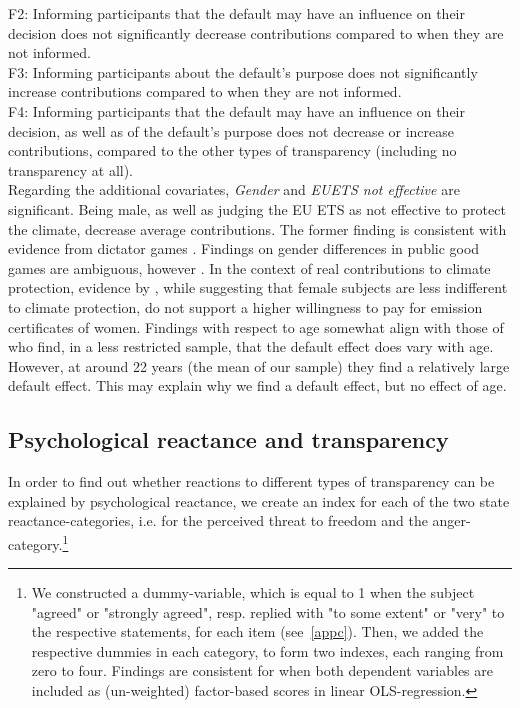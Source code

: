 \documentclass[review, authoryear,12pt]{elsarticle}
\begin{document}
F2: Informing participants that the default may have an influence on their decision does not significantly decrease contributions compared to when they are not informed.\\

F3: Informing participants about the default's purpose does not significantly increase contributions compared to when they are not informed.\\

F4: Informing participants that the default may have an influence on their decision, as well as of the default's purpose does not decrease or increase contributions, compared to the other types of transparency (including no transparency at all).\\

Regarding the additional covariates, \textit{Gender} and \textit{EUETS not effective} are significant. Being male, as well as judging the EU ETS as not effective to protect the climate, decrease average contributions. The former finding is consistent with evidence from dictator games \citep{Engel.2011}. Findings on gender differences in public good games are ambiguous, however \citep{Croson.2009}. In the context of real contributions to climate protection, evidence by \cite{Diederich.2014}, while suggesting that female subjects are less indifferent to climate protection, do not support a higher willingness to pay for emission certificates of women. Findings with respect to age somewhat align with those of \cite{Borghans.2015} who find, in a less restricted sample, that the default effect does vary with age. However, at around 22 years (the mean of our sample) they find a relatively large default effect. This may explain why we find a default effect, but no effect of age.

\subsection{Psychological reactance and transparency}
In order to find out whether reactions to different types of transparency can be explained by psychological reactance, we create an index for each of the two state reactance-categories, i.e. for the perceived threat to freedom and the anger-category.\footnote{We constructed a dummy-variable, which is equal to 1 when the subject "agreed" or "strongly agreed", resp. replied with "to some extent" or "very" to the respective statements, for each item (see~\ref{appc}). Then, we added the respective dummies in each category, to form two indexes, each ranging from zero to four. Findings are consistent for when both dependent variables are included as (un-weighted) factor-based scores in linear OLS-regression.}
\end{document}
